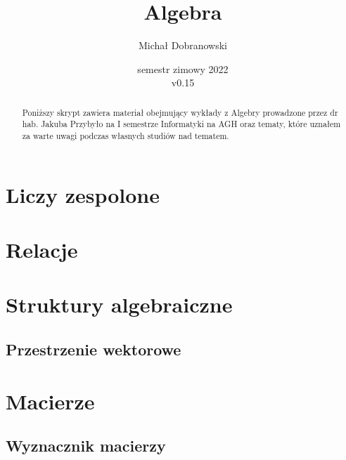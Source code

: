 \documentclass[11pt]{scrartcl}
\title{Algebra}
\author{Michał Dobranowski}
\date{semestr zimowy 2022 \\ v0.15}
\begin{document}
    \maketitle
    \begin{abstract}
        Poniższy skrypt zawiera materiał obejmujący wykłady z Algebry prowadzone przez dr hab. Jakuba Przybyło na I semestrze Informatyki na AGH oraz tematy, które uznałem za warte uwagi podczas własnych studiów nad tematem.
    \end{abstract}
    \tableofcontents
    \eject

    \section{Liczy zespolone}
    

    \section{Relacje}
    

    \section{Struktury algebraiczne}
    

        \subsection{Przestrzenie wektorowe}
        


    \section{Macierze}
    

        \subsection{Wyznacznik macierzy}
        
\end{document}
